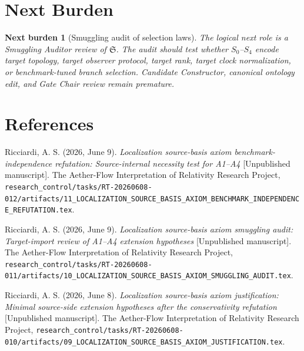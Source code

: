 \documentclass[11pt]{article}
\newcommand{\Sel}{\mathfrak{S}}
\newtheorem{nextburden}{Next burden}
\begin{document}
\section{Next Burden}

\begin{nextburden}[Smuggling audit of selection laws]
The logical next role is a Smuggling Auditor review of \(\Sel\). The audit
should test whether \(S_0\)--\(S_4\) encode target topology, target observer
protocol, target rank, target clock normalization, or benchmark-tuned branch
selection. Candidate Constructor, canonical ontology edit, and Gate Chair
review remain premature.
\end{nextburden}

\section*{References}

Ricciardi, A. S. (2026, June 9). \emph{Localization source-basis axiom
benchmark-independence refutation: Source-internal necessity test for A1--A4}
[Unpublished manuscript]. The Aether-Flow Interpretation of Relativity
Research Project,
\texttt{research\_control/tasks/RT-20260608-012/artifacts/11\_LOCALIZATION\_SOURCE\_BASIS\_AXIOM\_BENCHMARK\_INDEPENDENCE\_REFUTATION.tex}.

Ricciardi, A. S. (2026, June 9). \emph{Localization source-basis axiom
smuggling audit: Target-import review of A1--A4 extension hypotheses}
[Unpublished manuscript]. The Aether-Flow Interpretation of Relativity
Research Project,
\texttt{research\_control/tasks/RT-20260608-011/artifacts/10\_LOCALIZATION\_SOURCE\_BASIS\_AXIOM\_SMUGGLING\_AUDIT.tex}.

Ricciardi, A. S. (2026, June 8). \emph{Localization source-basis axiom
justification: Minimal source-side extension hypotheses after the
conservativity refutation} [Unpublished manuscript]. The Aether-Flow
Interpretation of Relativity Research Project,
\texttt{research\_control/tasks/RT-20260608-010/artifacts/09\_LOCALIZATION\_SOURCE\_BASIS\_AXIOM\_JUSTIFICATION.tex}.
\end{document}
